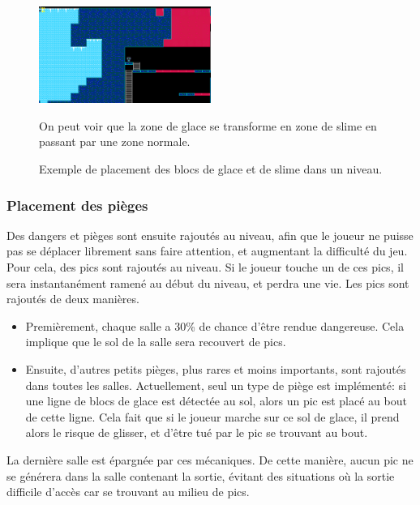 \documentclass[10pt]{report}
\begin{document}
\begin{figure}[H]
  \centering
  \includegraphics[width=0.5\textwidth]{images/perlin_noise_in_level}
  \caption{Exemple de placement des blocs de glace et de slime dans un niveau.}
  On peut voir que la zone de glace se transforme en zone de slime en passant par une zone normale.
\end{figure}

\subsubsection{Placement des pièges}

Des dangers et pièges sont ensuite rajoutés au niveau, afin que le joueur ne puisse pas se déplacer librement sans
faire attention, et augmentant la difficulté du jeu.
Pour cela, des pics sont rajoutés au niveau.
Si le joueur touche un de ces pics, il sera instantanément ramené au début du niveau, et perdra une vie.
Les pics sont rajoutés de deux manières.
\begin{itemize}
  \item Premièrement, chaque salle a 30\% de chance d'être rendue dangereuse.
  Cela implique que le sol de la salle sera recouvert de pics.
  \item Ensuite, d'autres petits pièges, plus rares et moins importants, sont rajoutés dans toutes les salles.
  Actuellement, seul un type de piège est implémenté: si une ligne de blocs de glace est détectée au sol, alors
  un pic est placé au bout de cette ligne.
  Cela fait que si le joueur marche sur ce sol de glace, il prend alors le risque de glisser, et d'être tué par le
  pic se trouvant au bout.
\end{itemize}

La dernière salle est épargnée par ces mécaniques.
De cette manière, aucun pic ne se générera dans la salle contenant la sortie, évitant des situations où la sortie
difficile d'accès car se trouvant au milieu de pics.
\end{document}
